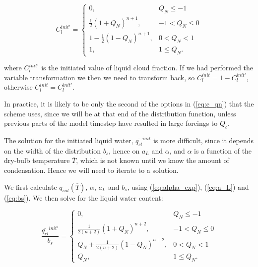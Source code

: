 \documentclass{UMDP_article}
\begin{document}
\begin{equation}
C_l^{init'} = \left\{  \begin{array}{ll}
               0,                                              &  Q_N \le -1      \\
               \frac{1}{2} {\left( 1 + Q_N \right)}^{n+1},     &  -1 < Q_N \le 0  \\
               1 - \frac{1}{2} {\left( 1 - Q_N \right)}^{n+1}, &  0 < Q_N < 1     \\
               1,                                              &  1 \le Q_N .
             \end{array} \right.
\label{eq:c_qn}
\end{equation}

where $C_l^{init'}$ is the initiated value of liquid cloud fraction.
If we had performed the variable transformation we then we need to
transform back, so $C_l^{init} = 1 - C_l^{init'}$, otherwise
$C_l^{init} = C_l^{init'}$.
 
In practice, it is likely to be only the second of the
options in (\ref{eq:c_qn}) that the scheme uses, since we will be at
that end of the distribution function, unless previous
parts of the model timestep have resulted in large
forcings to $Q_c$.

The solution for the initiated liquid water, $\overline{q_{cl}}^{init}$ is
more difficult, since it depends on the width of the distribution $b_s$,
hence on $a_L$ and $\alpha$, and $\alpha$ is a function of the dry-bulb
temperature $\overline{T}$, which is not known until we know the
amount of condensation.
Hence we will need to iterate to a solution.

We first calculate $q_{sat}(\overline{T})$, $\alpha$, $a_L$ and $b_s$, using
(\ref{eq:alpha_exp}), (\ref{eq:a_L}) and (\ref{eq:bs}). We then solve for the liquid
water content:

\begin{equation}
\frac{\overline{q_{cl}}^{init'}}{b_s} = \left\{  \begin{array}{ll}
                  0,                                            &  Q_N \le -1        \\
                  \frac{1}{2 (n+2)} {\left( 1 + Q_N \right)}^{n+2},       &  -1 < Q_N \le 0    \\
                  Q_N + \frac{1}{2 (n+2)} {\left( 1 - Q_N \right)}^{n+2}, &  0 < Q_N < 1       \\
                  Q_N,                                          &  1 \le Q_N .
                \end{array} \right.
\label{eq:l_bar}
\end{equation}
\end{document}
